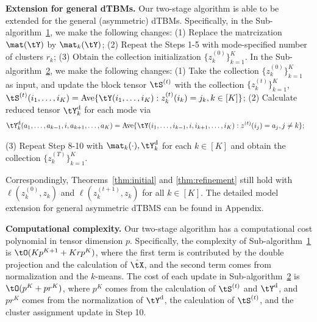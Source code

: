\documentclass[lettersize,onecolumn,journal]{IEEEtran}
\theoremstyle{definition}
\theoremstyle{definition}
\begin{document}
{\bf Extension for general dTBMs.} Our two-stage algorithm is able to be extended for the general (asymmetric) dTBMs. Specifically, in the Sub-algorithm~\hyperref[alg:main]{1}, we make the following changes: (1)
Replace the matrcization $\mat(\tY)$ by $\mat_k(\tY)$; (2) Repeat the Steps 1-5 with mode-specified number of clusters $r_k$; (3) Obtain the collection initialization $ \{z^{(0)}_k\}_{k=1}^K$. In the Sub-algorithm~\hyperref[alg:main]{2}, we make the following changes: (1) Take the collection $\{z^{(0)}_k\}_{k=1}^K$ as input, and update the block tensor $\tS^{(t)}$ with the collection $\{ z_k^{(t)}\}_{k=1}^K$, $
        \tS^{(t)}(i_1,\ldots, i_K) =  \text{Ave} \{\tY(i_1,\ldots,i_K): z^{(t)}_k(i_k) = j_k, k \in [K]\}$;
(2) Calculate reduced tensor $\tY^{\text{d}}_k$ for each mode via
\begin{align}
    &\tY^{\text{d}}_k(a_1,\ldots,a_{k-1}, i ,a_{k+1},\ldots,a_K) 
    = \text{Ave}\{\tY(i_1,\ldots,i_{k-1},i,i_{k+1},\ldots,i_K): z^{(t)}(i_j) = a_j, j \neq k \}; 
\end{align}

(3) Repeat Step 8-10 with $\mat_k(\cdot), \tY_k^{\text{d}}$ for each $k \in [K]$ and obtain the collection $\{z^{(T)}_k\}_{k=1}^K$. 

Correspondingly, Theorems~\ref{thm:initial} and \ref{thm:refinement} still hold with $\ell(z^{(0)}_k, z_k)$ and $\ell(z^{(t+1)}_k, z_k)$  for all $k \in [K]$. The detailed model extension for general asymmetric dTBMS can be found in Appendix. 

{\bf Computational complexity.} Our two-stage algorithm has a computational cost polynomial in tensor dimension $p$. Specifically, the complexity of Sub-algorithm~\hyperref[alg:main]{1} is $\tO(K p^{K+1} + Krp^K)$, where the first term is contributed by the double projection and the calculation of $\hat \tX$, and the second term comes from normalization and the $k$-means. The cost of each update in Sub-algorithm~\hyperref[alg:main]{2} is $\tO(p^K + pr^K)$, where $p^K$ comes from the calculation of $\tS^{(t)}$ and $\tY^{\text{d}}$, and $pr^K$ comes from the normalization of $\tY^{\text{d}}$, the calculation of $\tS^{(t)}$, and the cluster assignment update in Step 10.
\end{document}
